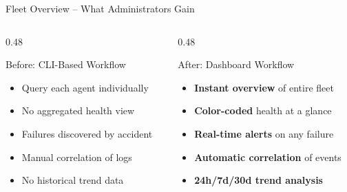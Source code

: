 \begin{frame}{Fleet Overview -- What Administrators Gain}
  \begin{columns}[T]
    \begin{column}{0.48\textwidth}
      \begin{block}{Before: CLI-Based Workflow}
        \scriptsize
        \begin{itemize}
          \item Query each agent individually
          \item No aggregated health view
          \item Failures discovered by accident
          \item Manual correlation of logs
          \item No historical trend data
        \end{itemize}
      \end{block}
    \end{column}
    \begin{column}{0.48\textwidth}
      \begin{exampleblock}{After: Dashboard Workflow}
        \scriptsize
        \begin{itemize}
          \item \textbf{Instant overview} of entire fleet
          \item \textbf{Color-coded} health at a glance
          \item \textbf{Real-time alerts} on any failure
          \item \textbf{Automatic correlation} of events
          \item \textbf{24h/7d/30d trend analysis}
        \end{itemize}
      \end{exampleblock}
    \end{column}
  \end{columns}

  \vspace{0.4cm}

  \begin{center}
  \end{center}
\end{frame}

